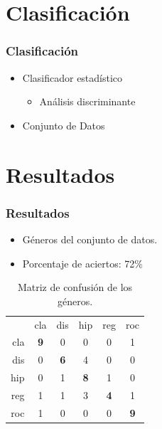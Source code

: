 \documentclass{beamer}
\begin{document}
\section{Clasificación}

\begin{frame}
\frametitle{Clasificación}
\begin{itemize}

\item Clasificador estadístico
	\begin{itemize}
		\item Análisis discriminante
	\end{itemize}
\item Conjunto de Datos

\end{itemize}
\end{frame}

\section{Resultados}

\begin{frame}
\frametitle{Resultados}
\begin{itemize}
	\item Géneros del conjunto de datos.
	\item Porcentaje de aciertos: 72\%
\end{itemize}

\begin{table}[htbp]
\caption{Matriz de confusión de los géneros.}
\begin{center}
\begin{tabular}{ r|c|c|c|c|c| }
\multicolumn{1}{r}{}
 & \multicolumn{1}{c}{cla}
 & \multicolumn{1}{c}{dis}
 & \multicolumn{1}{c}{hip}
 & \multicolumn{1}{c}{reg}
 & \multicolumn{1}{c}{roc} \\
\cline{2-6}
cla & \textbf{9} & 0 & 0 & 0 & 1\\
\cline{2-6}
dis & 0 & \textbf{6} & 4 & 0 & 0\\
\cline{2-6}
hip	& 0 & 1 & \textbf{8} & 1 & 0\\
\cline{2-6}
reg	& 1 & 1 & 3 & \textbf{4} & 1\\
\cline{2-6}
roc	& 1 & 0 & 0 & 0 & \textbf{9}\\
\cline{2-6}
\end{tabular}
\end{center}
\label{tab1}
\end{table}
\end{frame}
\end{document}
